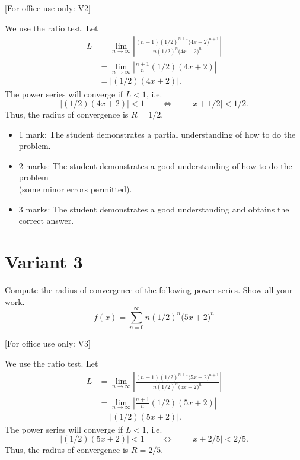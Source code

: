 \documentclass{article}
\begin{document}
[For office use only: V2]
        \medskip



    We use the ratio test. Let
      \begin{align*}
        L &= \lim_{n\to\infty} \left| 
        \frac{(n+1)\left(1/2\right)^{n+1}\big(4x + 2\big)^{n+1}}
        {n\left(1/2\right)^n \big(4x + 2\big)^n}
        \right|\\
        &= \lim_{n\to\infty} \left| \frac{n+1}{n}(1/2)(4x+2)\right| \\
        &= \left| (1/2)(4x+2)\right|.
       \end{align*}
       The power series will converge if $L < 1$, i.e.
       \[
        \left| (1/2)(4x+2)\right| < 1 \qquad\Longleftrightarrow \qquad
        \left|x + 1/2\right| < 1/2.
       \]
       Thus, the radius of convergence is $R = 1/2$.
        \medskip

            \begin{small}
            \begin{itemize}
            \item 1 mark: The student demonstrates a partial understanding of how to do the problem.
            \item 2 marks: The student demonstrates a good understanding of how to do the problem \\ (some minor errors permitted).
            \item 3 marks: The student demonstrates a good understanding and obtains the correct answer.
            \end{itemize}
            \end{small}


        \newpage
        \section{Variant 3}
        \label{v3}


Compute the radius of convergence of the following power series. Show all your work.
    \[
    f(x) = \sum_{n=0}^\infty n\left(1/2\right)^n \big(5x + 2\big)^n
    \]


[For office use only: V3]
        \medskip



    We use the ratio test. Let
      \begin{align*}
        L &= \lim_{n\to\infty} \left| 
        \frac{(n+1)\left(1/2\right)^{n+1}\big(5x + 2\big)^{n+1}}
        {n\left(1/2\right)^n \big(5x + 2\big)^n}
        \right|\\
        &= \lim_{n\to\infty} \left| \frac{n+1}{n}(1/2)(5x+2)\right| \\
        &= \left| (1/2)(5x+2)\right|.
       \end{align*}
       The power series will converge if $L < 1$, i.e.
       \[
        \left| (1/2)(5x+2)\right| < 1 \qquad\Longleftrightarrow \qquad
        \left|x + 2/5\right| < 2/5.
       \]
       Thus, the radius of convergence is $R = 2/5$.
        \medskip
\end{document}
